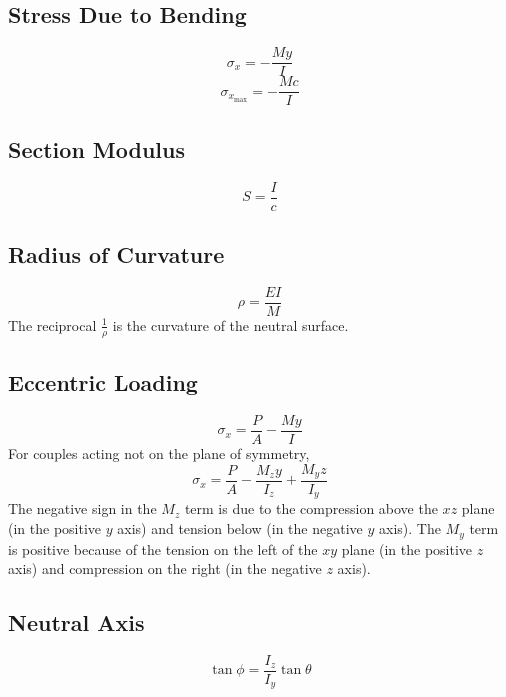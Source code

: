 \documentclass[twoside]{article}
\begin{document}
	\subsection{Stress Due to Bending}
	
	\begin{equation}
		\sigma_x = -\frac{My}{I}
		\label{eq:BendingStress}
	\end{equation}
	\begin{equation}
		\sigma_{x_\text{max}} = -\frac{Mc}{I}
		\label{eq:BendingStressMax}
	\end{equation}
	
	\subsection{Section Modulus}
	
	\begin{equation}
		S = \frac{I}{c}
		\label{eq:SectionModulus}
	\end{equation}
	
	\subsection{Radius of Curvature}
	
	\begin{equation}
		\rho = \frac{EI}{M}
		\label{eq:RadiusOfCurvature}
	\end{equation}
	The reciprocal $\frac{1}{\rho}$ is the curvature of the neutral surface.
	
	\subsection{Eccentric Loading}
	
	\begin{equation}
		\sigma_x = \frac{P}{A}-\frac{My}{I}
		\label{eq:EccentricLoading}
	\end{equation}
	For couples acting not on the plane of symmetry,
	\begin{equation}
		\sigma_x = \frac{P}{A}-\frac{M_z y}{I_z}+\frac{M_y z}{I_y}
		\label{eq:EccentricLoadingGeneral}
	\end{equation}
	The negative sign in the $M_z$ term is due to the compression above the $xz$ plane (in the positive $y$ axis) and tension below (in the negative $y$ axis). The $M_y$ term is positive because of the tension on the left of the $xy$ plane (in the positive $z$ axis) and compression on the right (in the negative $z$ axis).
	
	\subsection{Neutral Axis}
	
	\begin{equation}
		\tan \phi = \frac{I_z}{I_y} \tan \theta
		\label{eq:NeutralAxisAngle}
	\end{equation}
	
\end{document}
